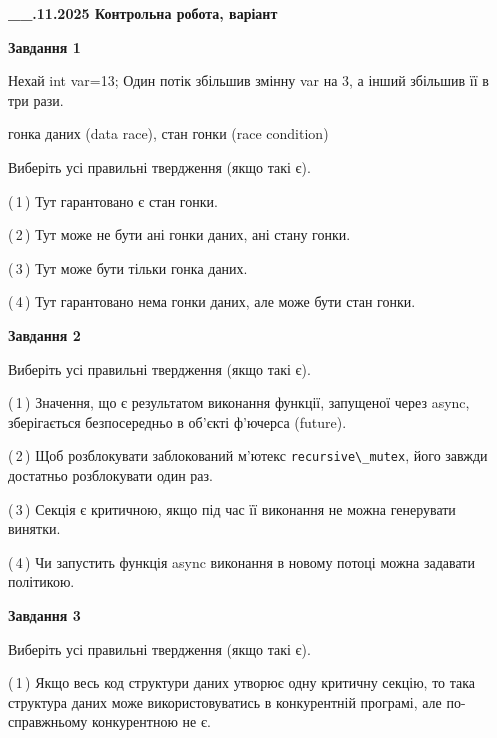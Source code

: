 \documentclass[12pt, ukrainian]{article}
\def\code#1{\Verb!#1!}
\begin{document}
\begin {large}

\textbf{\_\_.11.2025 Контрольна робота, варіант  }\par


{

\begin{center}
\textbf{Завдання 1}
\end{center}
Нехай int var=13; Один потік збільшив змінну var на 3, а інший збільшив її в три рази.

гонка даних (data race), стан гонки (race condition)

Виберіть усі правильні твердження (якщо такі є).\par
\vspace{2mm}
(\,1\,) Тут гарантовано є стан гонки.%

(\,2\,) Тут може не бути ані гонки даних, ані стану гонки.%

(\,3\,) Тут може бути тільки гонка даних.%

(\,4\,) Тут гарантовано нема гонки даних, але може бути стан гонки.%



\begin{center}
\textbf{Завдання 2}
\end{center}
Виберіть усі правильні твердження (якщо такі є).\par
\vspace{2mm}

(\,1\,) Значення, що є результатом виконання функції, запущеної через async, зберігається безпосередньо в об’єкті ф’ючерса (future).%

(\,2\,) Щоб розблокувати заблокований м’ютекс \code{recursive\_mutex}, його завжди достатньо розблокувати один раз.%

(\,3\,) Секція є критичною, якщо під час її виконання не можна генерувати винятки.%

(\,4\,) Чи запустить функція  async виконання в новому потоці можна задавати політикою.%



\begin{center}
\textbf{Завдання 3}
\end{center}
Виберіть усі правильні твердження (якщо такі є).\par
\vspace{2mm}

(\,1\,) Якщо весь код структури даних утворює одну критичну секцію, то така структура даних може використовуватись в конкурентній програмі, але по-справжньо\-му конкурентною не є.%

}
\end{large}
\end{document}
